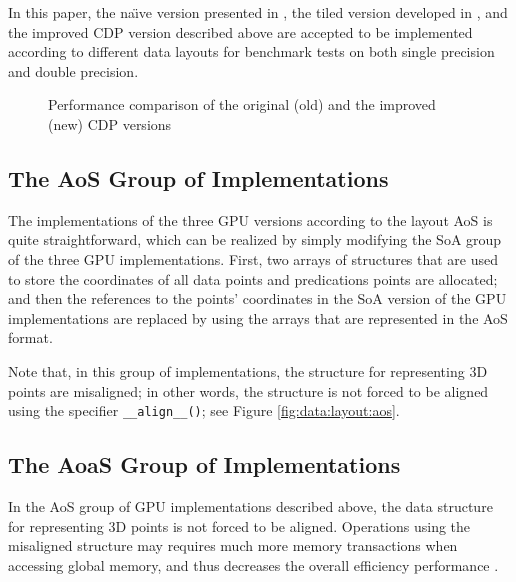 In this paper, the na\"{\i}ve version presented in \cite{huraj2010}, the tiled version 
developed in \cite{mei2014}, and the improved CDP version described above are 
accepted to be implemented according to different data layouts for benchmark 
tests on both single precision and double precision. 

\begin{figure}[htb]
    \centering
    \hspace{1em}
    \caption{Performance comparison of the original (old) and  the improved (new) CDP versions}
    \label{fig:new:cdp}       \end{figure}


\subsection{The AoS Group of Implementations}
\label{sec:implement:aos}

The implementations of the three GPU versions according to the layout AoS is 
quite straightforward, which can be realized by simply modifying the SoA 
group of the three GPU implementations. First, two arrays of structures 
that are used to store the coordinates of all data points and predications 
points are allocated; and then the references to the points' coordinates in 
the SoA version of the GPU implementations are replaced by using the arrays 
that are represented in the AoS format. 

Note that, in this group of implementations, the structure for 
representing 3D points are misaligned; in other words, the structure is 
not forced to be aligned using the specifier \texttt{{\_}{\_}align{\_}{\_}()}; see 
Figure \ref{fig:data:layout:aos}.


\subsection{The AoaS Group of Implementations}
\label{sec:implement:aoas}

In the AoS group of GPU implementations described above, the data structure for representing 3D 
points is not forced to be aligned. Operations using the misaligned 
structure may requires much more memory transactions when accessing global 
memory, and thus decreases the overall efficiency performance \cite{cuda2013}.

